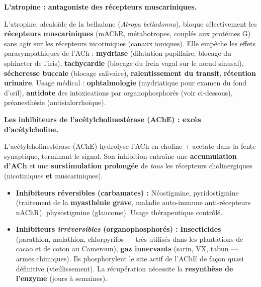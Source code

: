 \documentclass[11pt]{article}
\begin{document}
\textbf{L'atropine : antagoniste des récepteurs muscariniques.}\par
L'atropine, alcaloïde de la belladone (\emph{Atropa belladonna}), bloque sélectivement les \textbf{récepteurs muscariniques} (mAChR, métabotropes, couplés aux protéines G) sans agir sur les récepteurs nicotiniques (canaux ioniques). Elle empêche les effets parasympathiques de l'ACh : \textbf{mydriase} (dilatation pupillaire, blocage du sphincter de l'iris), \textbf{tachycardie} (blocage du frein vagal sur le nœud sinusal), \textbf{sécheresse buccale} (blocage salivaire), \textbf{ralentissement du transit}, \textbf{rétention urinaire}. Usage médical : \textbf{ophtalmologie} (mydriatique pour examen du fond d'œil), \textbf{antidote} des intoxications par organophosphorés (voir ci-dessous), préanesthésie (antisialorrhoïque).

\textbf{Les inhibiteurs de l'acétylcholinestérase (AChE) : excès d'acétylcholine.}\par
L'acétylcholinestérase (AChE) hydrolyse l'ACh en choline + acetate dans la fente synaptique, terminant le signal. Son inhibition entraîne une \textbf{accumulation d'ACh} et une \textbf{surstimulation prolongée} de \emph{tous} les récepteurs cholinergiques (nicotiniques \textbf{et} muscariniques).

\begin{itemize}
    \item \textbf{Inhibiteurs réversibles (carbamates) :} Néostigmine, pyridostigmine (traitement de la \textbf{myasthénie grave}, maladie auto-immune anti-récepteurs nAChR), physostigmine (glaucome). Usage thérapeutique contrôlé.
    \item \textbf{Inhibiteurs \emph{irréversibles} (organophosphorés) :} \textbf{Insecticides} (parathion, malathion, chlorpyrifos — très utilisés dans les plantations de cacao et de coton au Cameroun), \textbf{gaz innervants} (sarin, VX, tabun — armes chimiques). Ils phosphorylent le site actif de l'AChE de façon quasi définitive (vieillissement). La récupération nécessite la \textbf{resynthèse de l'enzyme} (jours à semaines).
\end{itemize}
\end{document}
